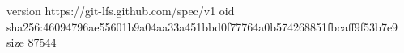 version https://git-lfs.github.com/spec/v1
oid sha256:46094796ae55601b9a04aa33a451bbd0f77764a0b574268851fbcaff9f53b7e9
size 87544
